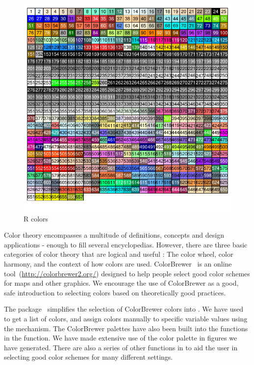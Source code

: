 \documentclass[nojss]{jss}\usepackage[]{graphicx}\usepackage[]{color}
\makeatletter
\def\maxwidth{ %
  \ifdim\Gin@nat@width>\linewidth
    \linewidth
  \else
    \Gin@nat@width
  \fi
}
\newenvironment{knitrout}{}{} %
\makeatother
\begin{document}
\begin{knitrout}\footnotesize
{}\color{fgcolor}\begin{figure}[htpb]


{\centering \includegraphics[width=\maxwidth]{figure/beamer-colorChart} 

}

\caption[R colors]{R colors\label{F:colorChart}}
\end{figure}


\end{knitrout}

Color theory encompasses a multitude of definitions, concepts and design applications - enough to fill several encyclopedias. However, there are three basic categories of color theory that are logical and useful : The color wheel, color harmony, and the context of how colors are used. ColorBrewer~\citep{Brewer:2003} is an online tool~(\url{http://colorbrewer2.org/}) designed to help people select good color schemes for maps and other graphics. We encourage the use of ColorBrewer as a good, safe introduction to selecting colors based on theoretically good practices. 

The  package~\citep{Neuwirth:2011} simplifies the selection of ColorBrewer colors into . We have used  to get a list of colors, and assign colors manually to specific variable values using the   mechanism. The ColorBrewer palettes have also been built into the   functions in the  function. We have made extensive use of the  color palette in figures we have generated. There are also a series of other  functions in  to aid the user in selecting good color schemes for many different settings.
\end{document}
